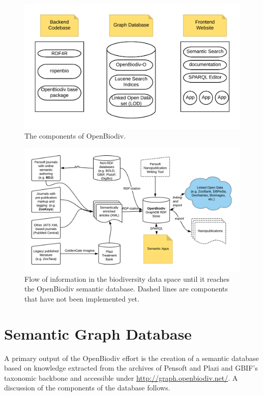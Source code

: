 \begin{figure}
\centering
\includegraphics[width=\textwidth]{Figures/components-openbiodiv}
\decoRule
\caption[OpenBiodiv Components]{The components of OpenBiodiv.}
\label{fig:openbiodiv-components}
\end{figure}

\begin{figure}
\centering
\includegraphics[width=\textwidth]{Figures/openbiodiv-sources}
\decoRule
\caption[OpenBiodiv Components]{Flow of information in the biodiversity data space until it reaches the OpenBiodiv semantic database. Dashed lines are components that have not been implemented yet.
}
\label{fig:openbiodiv-sources}
\end{figure}

\section{Semantic Graph Database}

A primary output of the OpenBiodiv effort is the creation of a semantic database based on knowledge extracted from the archives of Pensoft and Plazi and GBIF's taxonomic backbone and accessible under \url{http://graph.openbiodiv.net/}. A discussion of the components of the database follows.


